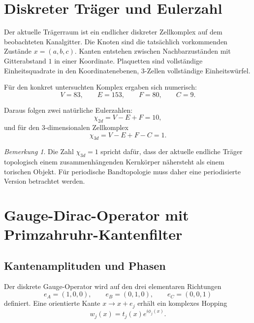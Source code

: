 \documentclass[11pt,a4paper]{article}
\theoremstyle{remark}
\newtheorem{bemerkung}[definition]{Bemerkung}
\begin{document}
	\section{Diskreter Träger und Eulerzahl}
	
	Der aktuelle Trägerraum ist ein endlicher diskreter Zellkomplex auf dem beobachteten Kanalgitter. Die Knoten sind die tatsächlich vorkommenden Zustände $x=(a,b,c)$. Kanten entstehen zwischen Nachbarzuständen mit Gitterabstand $1$ in einer Koordinate. Plaquetten sind vollständige Einheitsquadrate in den Koordinatenebenen, 3-Zellen vollständige Einheitswürfel.
	
	Für den konkret untersuchten Komplex ergaben sich numerisch:
	\begin{equation}
		V=83,
		\qquad
		E=153,
		\qquad
		F=80,
		\qquad
		C=9.
	\end{equation}
	
	Daraus folgen zwei natürliche Eulerzahlen:
	\begin{equation}
		\chi_{2d}=V-E+F=10,
	\end{equation}
	und für den 3-dimensionalen Zellkomplex
	\begin{equation}
		\chi_{3d}=V-E+F-C=1.
	\end{equation}
	
	\begin{bemerkung}
		Die Zahl $\chi_{3d}=1$ spricht dafür, dass der aktuelle endliche Träger topologisch einem zusammenhängenden Kernkörper nähersteht als einem torischen Objekt. Für periodische Bandtopologie muss daher eine periodisierte Version betrachtet werden.
	\end{bemerkung}
	
	\section{Gauge-Dirac-Operator mit Primzahruhr-Kantenfilter}
	
	\subsection{Kantenamplituden und Phasen}
	
	Der diskrete Gauge-Operator wird auf den drei elementaren Richtungen
	\begin{equation}
		e_A=(1,0,0),\qquad e_B=(0,1,0),\qquad e_C=(0,0,1)
	\end{equation}
	definiert. Eine orientierte Kante $x\to x+e_j$ erhält ein komplexes Hopping
	\begin{equation}
		w_j(x)=t_j(x)e^{i\phi_j(x)}.
	\end{equation}
	
\end{document}
